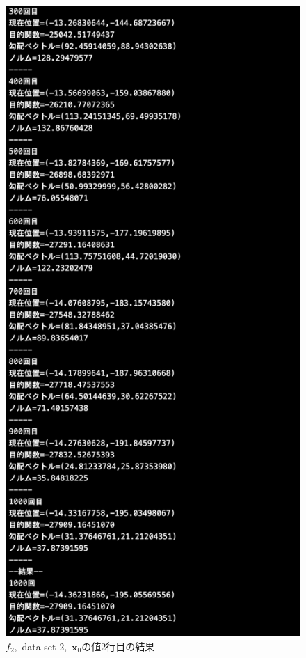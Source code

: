 \documentclass[12pt]{jarticle}
\begin{document}
\begin{figure}[h]
\begin{minipage}{0.5\hsize}
    \end{minipage}
    \begin{minipage}{0.5\hsize}
        \begin{center}
            \includegraphics[scale=0.2]{kadai1_2s_out2_2_3.png}
        \end{center}
    \end{minipage}
    \caption{$f_2$,\ data set 2,\ $\boldsymbol{x}_0$の値2行目の結果}
\end{figure}
\end{document}
